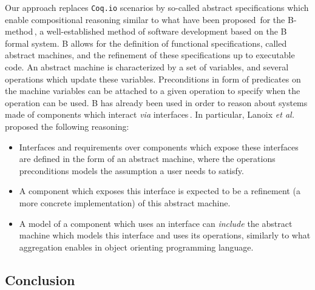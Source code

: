 Our approach replaces \texttt{Coq.io} scenarios by so-called abstract
specifications which enable compositional reasoning similar to what have been
proposed\,\cite{souquieres2005verifying,chouali2006proving,lanoix:hal-00105041}
for the B-method\,\cite{abrial2005b}, a well-established method of software
development based on the B formal system.
%
B allows for the definition of functional specifications, called abstract
machines, and the refinement of these specifications up to executable code.
%
An abstract machine is characterized by a set of variables, and several
operations which update these variables. Preconditions in form of predicates on
the machine variables can be attached to a given operation to specify when the
operation can be used.
%
B has already been used in order to reason about systems made of components
which interact \emph{via}
interfaces\,\cite{souquieres2005verifying,chouali2006proving,lanoix:hal-00105041}.
%
In particular, Lanoix \emph{et al.}\,\cite{lanoix:hal-00105041} proposed the
following reasoning:
%
\begin{itemize}
\item Interfaces and requirements over components which expose these interfaces
  are defined in the form of an abstract machine, where the operations
  preconditions models the assumption a user needs to satisfy.
\item A component which exposes this interface is expected to be a refinement (a
  more concrete implementation) of this abstract machine.
\item A model of a component which uses an interface can \emph{include} the
  abstract machine which models this interface and uses its operations,
  similarly to what aggregation enables in object orienting programming
  language.
\end{itemize}

%

\subsection{Conclusion}
\label{subsec:sota:compconclu}

